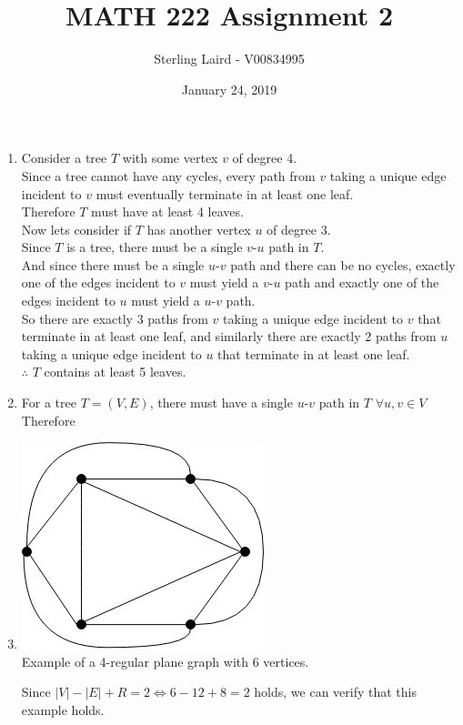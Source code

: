 \documentclass[11pt]{article}
\title{MATH 222 Assignment 2}
\author{Sterling Laird - V00834995}
\date{January 24, 2019}
\begin{document}
\maketitle
\pagebreak

\begin{enumerate}[]
    \item
    	Consider a tree $T$ with some vertex $v$ of degree 4.\\
    	Since a tree cannot have any cycles, every path from $v$ taking a unique edge incident to $v$ must eventually terminate in at least one leaf.\\
    	Therefore $T$ must have at least 4 leaves.\\
    	Now lets consider if $T$ has another vertex $u$ of degree 3.\\
    	Since $T$ is a tree, there must be a single $v$-$u$ path in $T$.\\
    	And since there must be a single $u$-$v$ path and there can be no cycles, exactly one of the edges incident to $v$ must yield a $v$-$u$ path and exactly one of the edges incident to $u$ must yield a $u$-$v$ path.\\
    	So there are exactly 3 paths from $v$ taking a unique edge incident to $v$ that terminate in at least one leaf, and similarly  there are exactly 2 paths from $u$ taking a unique edge incident to $u$ that terminate in at least one leaf.\\
    	$\therefore$ $T$ contains at least 5 leaves.
    \item 
    	For a tree $T=(V,E)$, there must have a single $u$-$v$ path in $T$ $\forall u,v \in V$\\
    	Therefore 
    \item \mbox{}
    \begin{center}
		\includegraphics[scale=0.5]{q3-graph.png}\\
		Example of a 4-regular plane graph with 6 vertices.
	\end{center}
	Since $|V|-|E|+R=2 \iff 6 - 12 + 8 = 2$ holds, we can verify that this example holds.
   		

\end{enumerate}
\end{document}
